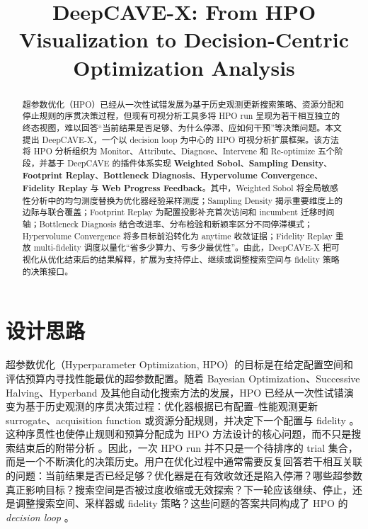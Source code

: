 \documentclass[11pt,a4paper]{ctexart}
\newcommand{\DeepCAVEX}{DeepCAVE-X}
\begin{document}
\title{\textbf{DeepCAVE-X: From HPO Visualization to Decision-Centric Optimization Analysis}}
\author{}
\date{}

\maketitle

\begin{abstract}
超参数优化（HPO）已经从一次性试错发展为基于历史观测更新搜索策略、资源分配和停止规则的序贯决策过程，但现有可视分析工具多将 HPO run 呈现为若干相互独立的终态视图，难以回答“当前结果是否足够、为什么停滞、应如何干预”等决策问题。本文提出 \DeepCAVEX{}，一个以 decision loop 为中心的 HPO 可视分析扩展框架。该方法将 HPO 分析组织为 Monitor、Attribute、Diagnose、Intervene 和 Re-optimize 五个阶段，并基于 DeepCAVE 的插件体系实现 \textbf{Weighted Sobol}、\textbf{Sampling Density}、\textbf{Footprint Replay}、\textbf{Bottleneck Diagnosis}、\textbf{Hypervolume Convergence}、\textbf{Fidelity Replay} 与 \textbf{Web Progress Feedback}。其中，Weighted Sobol 将全局敏感性分析中的均匀测度替换为优化器经验采样测度；Sampling Density 揭示重要维度上的边际与联合覆盖；Footprint Replay 为配置投影补充首次访问和 incumbent 迁移时间轴；Bottleneck Diagnosis 结合改进率、分布检验和新颖率区分不同停滞模式；Hypervolume Convergence 将多目标前沿转化为 anytime 收敛证据；Fidelity Replay 重放 multi-fidelity 调度以量化“省多少算力、亏多少最优性”。由此，DeepCAVE-X 把可视化从优化结束后的结果解释，扩展为支持停止、继续或调整搜索空间与 fidelity 策略的决策接口。
\end{abstract}

\section{设计思路}

超参数优化（Hyperparameter Optimization, HPO）的目标是在给定配置空间和评估预算内寻找性能最优的超参数配置。随着 Bayesian Optimization、Successive Halving、Hyperband 及其他自动化搜索方法的发展，HPO 已经从一次性试错演变为基于历史观测的序贯决策过程：优化器根据已有配置--性能观测更新 surrogate、acquisition function 或资源分配规则，并决定下一个配置与 fidelity \cite{jones1998efficient,snoek2012practical,li2018hyperband,falkner2018bohb,bischl2021hpo}。这种序贯性也使停止规则和预算分配成为 HPO 方法设计的核心问题，而不只是搜索结束后的附带分析 \cite{li2018hyperband,falkner2018bohb,holzleitner2021hpo}。因此，一次 HPO run 并不只是一个待排序的 trial 集合，而是一个不断演化的决策历史。用户在优化过程中通常需要反复回答若干相互关联的问题：当前结果是否已经足够？优化器是在有效收敛还是陷入停滞？哪些超参数真正影响目标？搜索空间是否被过度收缩或无效探索？下一轮应该继续、停止，还是调整搜索空间、采样器或 fidelity 策略？这些问题的答案共同构成了 HPO 的 \emph{decision loop} \cite{bergstra2012random,hutter2014importance}。
\end{document}
